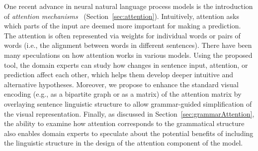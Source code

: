One recent advance in neural natural language process models is the
introduction of \emph{attention
  mechanisms}~\cite[for example]{bahdanau2014neural,VaswaniShazeerParmar2017}
(Section~\ref{sec:attention}). Intuitively, attention asks which parts of the
input are deemed more important for making a prediction. The attention is often represented via weights for individual words or pairs of words (i.e., the alignment between words in different sentences).
%
There have been many speculations on how attention works in various models.
Using the proposed tool, the domain experts can study how changes in sentence input, attention, or prediction affect each other, which helps them develop deeper intuitive and alternative hypotheses. 
Moreover, we propose to enhance the standard visual encoding (e.g., as a bipartite graph or as a matrix) of the attention matrix by overlaying sentence linguistic structure to allow grammar-guided simplification of the visual representation.
%
Finally, as discussed in Section~\ref{sec:grammarAttention}, the ability to examine how attention corresponds to the grammatical structure also enables domain experts to speculate about the potential benefits of including the linguistic structure in the design of the attention component of the model.

